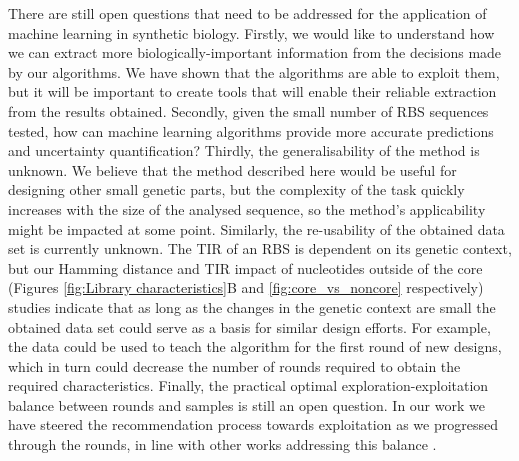 \documentclass{scrartcl}[2013/05/29]%
\begin{document}
There are still open questions that need to be addressed for the application of machine learning in synthetic biology.
Firstly, we would like to understand how we can extract more biologically-important information from the decisions made by our algorithms.
We have shown that the algorithms are able to exploit them, but it will be important to create tools that will enable their reliable extraction from the results obtained.
Secondly, given the small number of RBS sequences tested, how can machine learning algorithms provide more accurate predictions and uncertainty quantification?
Thirdly, the generalisability of the method is unknown.
We believe that the method described here would be useful for designing other small genetic parts, but the complexity of the task quickly increases with the size of the analysed sequence, so the method's applicability might be impacted at some point.
Similarly, the re-usability of the obtained data set is currently unknown.
The TIR of an RBS is dependent on its genetic context, but our Hamming distance and TIR impact of nucleotides outside of the core (Figures \ref{fig:Library characteristics}B and \ref{fig:core_vs_noncore} respectively) studies indicate that as long as the changes in the genetic context are small the obtained data set could serve as a basis for similar design efforts.
For example, the data could be used to teach the algorithm for the first round of new designs, which in turn could decrease the number of rounds required to obtain the required characteristics.
Finally, the practical optimal exploration-exploitation balance between rounds and samples is still an open question.
In our work we have steered the recommendation process towards exploitation as we progressed through the rounds, in line with other works addressing this balance \mbox{\cite{Radivojevic2020}}.
\\
\end{document}
